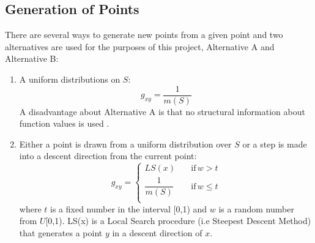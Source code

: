 \subsection{Generation of Points} 
\label{sec:gen-points}
There are several ways to generate new points from a given point and two alternatives are used for the purposes of this project, Alternative A and Alternative B:
\begin{enumerate}[label=\textbf{(\Alph*)}]
    \item A uniform distributions on $S$:
    \begin{equation}
        g_{xy}=\frac{1}{m(S)} 
    \end{equation}
A disadvantage about Alternative A is that no structural information about function values is used \cite{dekkers}.
    \item Either a point is drawn from a uniform distribution over $S$ or a step is made into a descent direction from the current point:
    \begin{equation}
    g_{xy}=\begin{cases}
          LS(x) \quad &\text{if} \, w>t \\
          \dfrac{1}{m(S)} \quad &\text{if} \, w \leq t \\
     \end{cases} 
    \end{equation}
    where $t$ is a fixed number in the interval [0,1) and $w$ is a random number from $U$[0,1). LS(x) is a Local Search procedure (i.e Steepest Descent Method) that generates a point $y$ in a descent direction of $x$. \cite{dekkers}

\end{enumerate}




 
